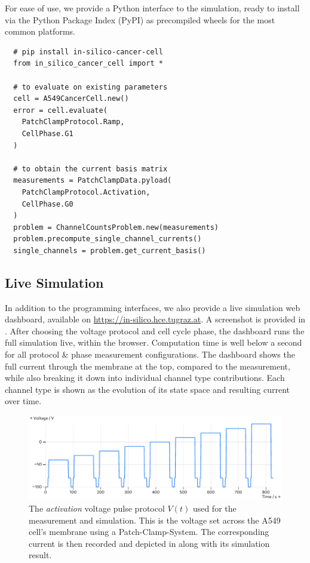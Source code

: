 For ease of use, we provide a Python interface to the simulation, ready to install via the Python Package Index (PyPI) as precompiled wheels for the most common platforms.

\begin{verbatim}
  # pip install in-silico-cancer-cell
  from in_silico_cancer_cell import *

  # to evaluate on existing parameters
  cell = A549CancerCell.new()
  error = cell.evaluate(
    PatchClampProtocol.Ramp,
    CellPhase.G1
  )

  # to obtain the current basis matrix
  measurements = PatchClampData.pyload(
    PatchClampProtocol.Activation,
    CellPhase.G0
  )
  problem = ChannelCountsProblem.new(measurements)
  problem.precompute_single_channel_currents()
  single_channels = problem.get_current_basis()
\end{verbatim}

\subsection{Live Simulation}
In addition to the programming interfaces, we also provide a live simulation web dashboard, available on \url{https://in-silico.hce.tugraz.at}. A screenshot is provided in .
After choosing the voltage protocol and cell cycle phase, the dashboard runs the full simulation live, within the browser.
Computation time is well below a second for all protocol \& phase measurement configurations.
The dashboard shows the full current through the membrane at the top, compared to the measurement, while also breaking it down into individual channel type contributions.
Each channel type is shown as the evolution of its state space and resulting current over time.

\begin{figure}
  \includegraphics[width=\columnwidth]{../figures/results/voltage-protocol.pdf}
  \caption{The \textit{activation} voltage pulse protocol $V(t)$ used for the measurement and simulation. This is the voltage set across the A549 cell's membrane using a Patch-Clamp-System. The corresponding current is then recorded and depicted in  along with its simulation result.}
  \label{figure:voltage-protocol}
\end{figure}


